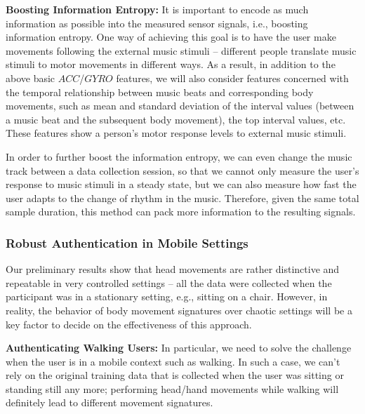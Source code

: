 \vspace{4pt}\textbf{Boosting Information Entropy:} It is important to encode as much information as possible into the measured sensor signals, i.e., boosting information entropy. One way of achieving this goal is to have the user make movements following the external music stimuli -- different people translate music stimuli to motor movements in different ways. As a result, in addition to the above basic $ACC$/$GYRO$ features, we will also consider features concerned with the temporal relationship between music beats and corresponding body movements, such as mean and standard deviation of the interval values (between a music beat and the subsequent body movement), the top interval values, etc. These features show a person's motor response levels to external music stimuli.

In order to further boost the information entropy, we can even change the music track between a data collection session, so that we cannot only measure the user's response to music stimuli in a steady state, but we can also measure how fast the user adapts to the change of rhythm in the music. Therefore, given the same total sample duration, this method can pack more information to the resulting signals.



\subsubsection{Robust Authentication in Mobile Settings}
Our preliminary results show that head movements are rather distinctive and repeatable in very controlled settings -- all the data were collected when the participant was in a stationary setting, e.g., sitting on a chair. However, in reality, the behavior of body movement signatures over chaotic settings will be a key factor to decide on the effectiveness of this approach. %

\vspace{4pt}\textbf{Authenticating Walking Users:} In particular, we need to solve the challenge when the user is in a mobile context such as walking. In such a case, we can't rely on the original training data that is collected when the user was sitting or standing still any more; performing head/hand movements while walking will definitely lead to different movement signatures.

